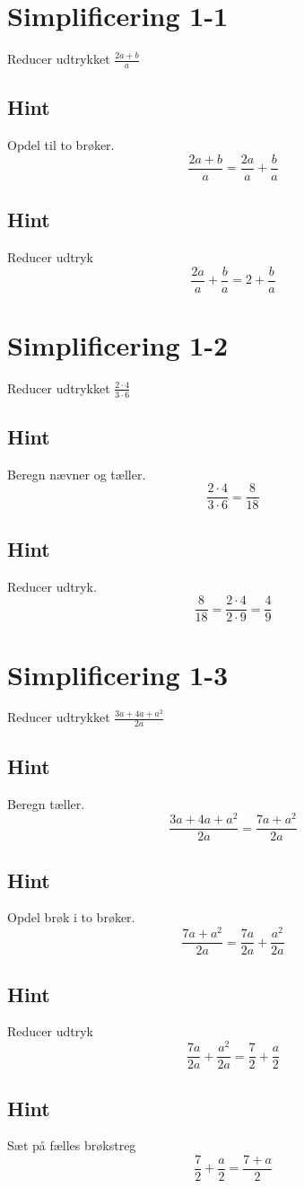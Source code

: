 \documentclass{article}
\newenvironment{exercise}[1]{\newpage\section{#1}}{}
\newcommand{\answerbox}[1]{\fbox{$#1$}}
\newcommand{\hint}{\subsection*{Hint}}
\begin{document}
\tableofcontents
\newpage

\begin{exercise}{Simplificering 1-1}

Reducer udtrykket $\frac{2a+b}{a}$

\answerbox{2 + \frac{b}{a}}

\hint

Opdel  til to brøker.
\[
\frac{2a+b}{a} = \frac{2a}{a} + \frac{b}{a}
\]

\hint

Reducer udtryk 
\[
\frac{2a}{a} + \frac{b}{a}  = 2 + \frac{b}{a}
\]

\end{exercise}

\newpage

\begin{exercise}{Simplificering 1-2}
	
	Reducer udtrykket $\frac{2 \cdot 4}{3 \cdot 6}$
	
	\answerbox{\frac{4}{9}}
	
	\hint
	
	Beregn nævner og tæller.
	\[
	\frac{2 \cdot 4}{3 \cdot 6}  = \frac{8}{18} 
	\]
	
	\hint
	
	Reducer udtryk.
	\[
	\frac{8}{18} = \frac{2 \cdot 4}{2 \cdot 9} = \frac{4}{9}
	\]
	
\end{exercise}

\newpage

\begin{exercise}{Simplificering 1-3}
	
	Reducer udtrykket $\frac{3a+4a+a^2}{2a}$
	
	\answerbox{\frac{7+a}{2}}
	
	\hint
	
	Beregn tæller.
	\[
	\frac{3a+4a+a^2}{2a} = \frac{7a+a^2}{2a}
	\]
	
	\hint
	
	Opdel brøk i to brøker.
	\[
	\frac{7a+a^2}{2a}  = \frac{7a}{2a} + \frac{a^2}{2a} 
	\]
	
	\hint
	
	Reducer udtryk
	\[
	\frac{7a}{2a} + \frac{a^2}{2a}  = \frac{7}{2} + \frac{a}{2}
	\]	 
	
	\hint
	
	Sæt på fælles brøkstreg
	\[
	\frac{7}{2} + \frac{a}{2} = \frac{7+a}{2} 
	\]
	
\end{exercise}
\end{document}
